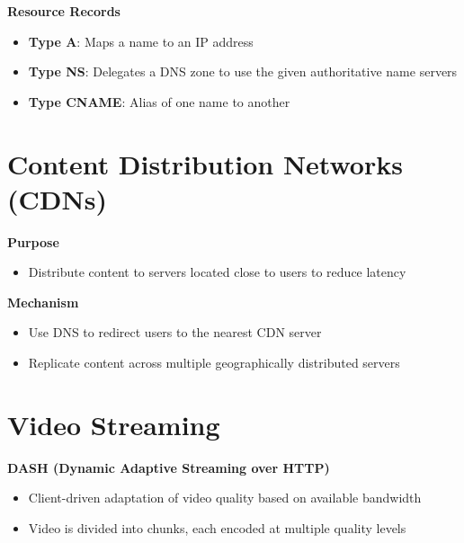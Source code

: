 \documentclass[9pt]{extarticle}
\begin{document}
\begin{multicols*}{3}
\textbf{Resource Records}
\begin{itemize}
    \item \textbf{Type A}: Maps a name to an IP address
    \item \textbf{Type NS}: Delegates a DNS zone to use the given authoritative name servers
    \item \textbf{Type CNAME}: Alias of one name to another
\end{itemize}

{\color{sectioncolor}\section*{\centering Content Distribution Networks (CDNs)}}
\textbf{Purpose}
\begin{itemize}
    \item Distribute content to servers located close to users to reduce latency
\end{itemize}

\textbf{Mechanism}
\begin{itemize}
    \item Use DNS to redirect users to the nearest CDN server
    \item Replicate content across multiple geographically distributed servers
\end{itemize}

{\color{sectioncolor}\section*{\centering Video Streaming}}
\textbf{DASH (Dynamic Adaptive Streaming over HTTP)}
\begin{itemize}
    \item Client-driven adaptation of video quality based on available bandwidth
    \item Video is divided into chunks, each encoded at multiple quality levels
\end{itemize}


\end{multicols*}
\end{document}
